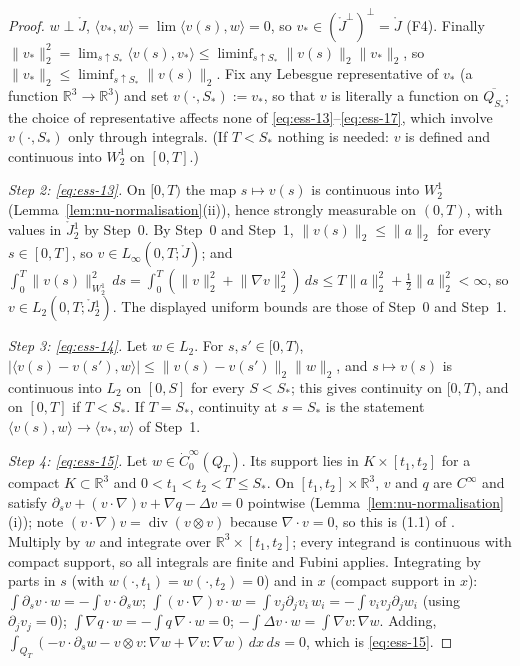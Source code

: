\documentclass[11pt]{article}
\theoremstyle{definition}
\theoremstyle{plain}
\newcommand{\R}{\mathbb R}
\newcommand{\norm}[1]{\lVert #1\rVert}
\begin{document}
\begin{proof}
$w\perp\mathring J$, $\langle v_*,w\rangle=\lim\langle v(s),w\rangle=0$, so
$v_*\in(\mathring J^\perp)^\perp=\mathring J$ (F4).  Finally
$\norm{v_*}_2^2=\lim_{s\uparrow S_*}\langle v(s),v_*\rangle
\leq\liminf_{s\uparrow S_*}\norm{v(s)}_2\norm{v_*}_2$, so
$\norm{v_*}_2\leq\liminf_{s\uparrow S_*}\norm{v(s)}_2$.
Fix any Lebesgue representative of $v_*$ (a function $\R^3\to\R^3$) and set
$v(\cdot,S_*):=v_*$, so that $v$ is literally a function on
$\overline{Q_{S_*}}$; the choice of representative affects none of
\eqref{eq:ess-13}--\eqref{eq:ess-17}, which involve $v(\cdot,S_*)$ only
through integrals.  (If $T<S_*$ nothing is needed: $v$ is defined and
continuous into $W^1_2$ on $[0,T]$.)

\emph{Step 2: \eqref{eq:ess-13}.}  On $[0,T)$ the map $s\mapsto v(s)$ is
continuous into $W^1_2$ (Lemma~\ref{lem:nu-normalisation}(ii)), hence
strongly measurable on $(0,T)$, with values in $\mathring J{}^1_2$ by Step~0.
By Step~0 and Step~1, $\norm{v(s)}_2\leq\norm a_2$ for every $s\in[0,T]$, so
$v\in L_\infty(0,T;\mathring J)$; and
$\int_0^T\norm{v(s)}_{W^1_2}^2\,ds=\int_0^T(\norm{v}_2^2+\norm{\nabla v}_2^2)\,ds
\leq T\norm a_2^2+\tfrac12\norm a_2^2<\infty$, so
$v\in L_2(0,T;\mathring J{}^1_2)$.  The displayed uniform bounds are those of
Step~0 and Step~1.

\emph{Step 3: \eqref{eq:ess-14}.}  Let $w\in L_2$.  For $s,s'\in[0,T)$,
$|\langle v(s)-v(s'),w\rangle|\leq\norm{v(s)-v(s')}_2\norm w_2$, and
$s\mapsto v(s)$ is continuous into $L_2$ on $[0,S]$ for every $S<S_*$; this
gives continuity on $[0,T)$, and on $[0,T]$ if $T<S_*$.  If $T=S_*$,
continuity at $s=S_*$ is the statement $\langle v(s),w\rangle\to\langle v_*,w\rangle$
of Step~1.

\emph{Step 4: \eqref{eq:ess-15}.}  Let $w\in\dot C_0^\infty(Q_T)$.  Its support
lies in $K\times[t_1,t_2]$ for a compact $K\subset\R^3$ and
$0<t_1<t_2<T\leq S_*$.  On $[t_1,t_2]\times\R^3$, $v$ and $q$ are $C^\infty$
and satisfy $\partial_sv+(v\cdot\nabla)v+\nabla q-\Delta v=0$ pointwise
(Lemma~\ref{lem:nu-normalisation}(i)); note $(v\cdot\nabla)v=\operatorname{div}(v\otimes v)$
because $\nabla\cdot v=0$, so this is (1.1) of \cite{ESS2003}.  Multiply by
$w$ and integrate over $\R^3\times[t_1,t_2]$; every integrand is continuous
with compact support, so all integrals are finite and Fubini applies.
Integrating by parts in $s$ (with $w(\cdot,t_1)=w(\cdot,t_2)=0$) and in $x$
(compact support in $x$):
$\int\partial_sv\cdot w=-\int v\cdot\partial_sw$;
$\int(v\cdot\nabla)v\cdot w=\int v_j\partial_jv_i\,w_i=-\int v_iv_j\partial_jw_i$
(using $\partial_jv_j=0$);
$\int\nabla q\cdot w=-\int q\,\nabla\cdot w=0$;
$-\int\Delta v\cdot w=\int\nabla v:\nabla w$.  Adding,
$\int_{Q_T}(-v\cdot\partial_sw-v\otimes v:\nabla w+\nabla v:\nabla w)\,dx\,ds=0$,
which is \eqref{eq:ess-15}.


\end{proof}
\end{document}
